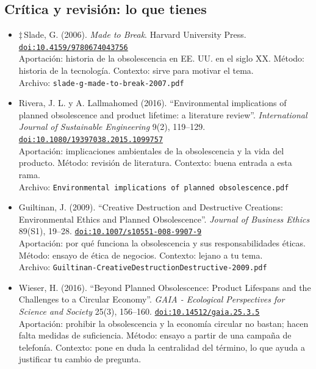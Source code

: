 \documentclass[11pt]{article}
\begin{document}
\subsection*{Crítica y revisión: lo que tienes}
\begin{itemize}
\item $\ddagger$\,Slade, G. (2006). \textit{Made to Break}. Harvard University Press. \href{https://doi.org/10.4159/9780674043756}{\texttt{doi:10.4159/9780674043756}}\\
Aportación: historia de la obsolescencia en EE. UU. en el siglo XX. Método: historia de la tecnología. Contexto: sirve para motivar el tema.\\
{\footnotesize Archivo: \texttt{slade-g-made-to-break-2007.pdf}}
\item Rivera, J. L. y A. Lallmahomed (2016). ``Environmental implications of planned obsolescence and product lifetime: a literature review''. \textit{International Journal of Sustainable Engineering} 9(2), 119--129. \href{https://doi.org/10.1080/19397038.2015.1099757}{\texttt{doi:10.1080/19397038.2015.1099757}}\\
Aportación: implicaciones ambientales de la obsolescencia y la vida del producto. Método: revisión de literatura. Contexto: buena entrada a esta rama.\\
{\footnotesize Archivo: \texttt{Environmental implications of planned obsolescence.pdf}}
\item Guiltinan, J. (2009). ``Creative Destruction and Destructive Creations: Environmental Ethics and Planned Obsolescence''. \textit{Journal of Business Ethics} 89(S1), 19--28. \href{https://doi.org/10.1007/s10551-008-9907-9}{\texttt{doi:10.1007/s10551-008-9907-9}}\\
Aportación: por qué funciona la obsolescencia y sus responsabilidades éticas. Método: ensayo de ética de negocios. Contexto: lejano a tu tema.\\
{\footnotesize Archivo: \texttt{Guiltinan-CreativeDestructionDestructive-2009.pdf}}
\item Wieser, H. (2016). ``Beyond Planned Obsolescence: Product Lifespans and the Challenges to a Circular Economy''. \textit{GAIA - Ecological Perspectives for Science and Society} 25(3), 156--160. \href{https://doi.org/10.14512/gaia.25.3.5}{\texttt{doi:10.14512/gaia.25.3.5}}\\
Aportación: prohibir la obsolescencia y la economía circular no bastan; hacen falta medidas de suficiencia. Método: ensayo a partir de una campaña de telefonía. Contexto: pone en duda la centralidad del término, lo que ayuda a justificar tu cambio de pregunta.\\

\end{itemize}
\end{document}
